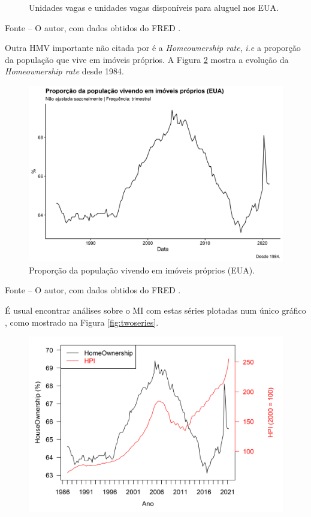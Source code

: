 \documentclass[
	12pt,				%
	oneside,			%
	a4paper,			%
	chapter=TITLE,		%
	section=TITLE,		%
	english,			%
	brazil				%
	]{abntex2}
\newcommand{\bcenter}{\begin{center}}
\newcommand{\ecenter}{\end{center}}
\begin{document}
\begin{refsection}
\begin{figure}[H]
{}

\caption{Unidades vagas e unidades vagas disponíveis para aluguel nos EUA.}\label{fig:vacancy}
\end{figure}
\bcenter

\small Fonte -- O autor, com dados obtidos do FRED \autocite{ERENTUSQ176N,EVACANTUSQ176N}.
\ecenter

Outra \gls{HMV} importante não citada por \textcite{macroHousing} é a \emph{Homeownership rate},
\emph{i.e} a proporção da população que vive em imóveis próprios. A Figura
\ref{fig:USHOWN} mostra a evolução da \emph{Homeownership rate} desde 1984.
\begin{figure}[H]

{\centering \includegraphics[width=0.7\linewidth]{images/USHOWN-1} 

}

\caption{Proporção da população vivendo em imóveis próprios (\gls{EUA}).}\label{fig:USHOWN}
\end{figure}
\bcenter

\small Fonte -- O autor, com dados obtidos do FRED \autocite{RSAHORUSQ156S}.
\ecenter

É usual encontrar análises sobre o \gls{MI} com estas séries plotadas num
único gráfico \autocites[ver][]{FRED2014,FRED2016,FRED2018}, como mostrado na Figura
\ref{fig:twoseries}.
\begin{figure}[H]

{\centering \includegraphics[width=1\linewidth]{images/twoseries-1} 

}
\end{figure}
\end{refsection}
\end{document}
